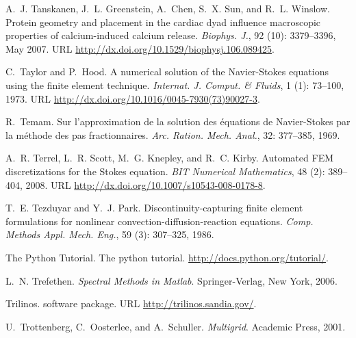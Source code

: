 \begin{thebibliography}{467}
A.~J. Tanskanen, J.~L. Greenstein, A.~Chen, S.~X. Sun, and R.~L. Winslow.
\newblock Protein geometry and placement in the cardiac dyad influence
  macroscopic properties of calcium-induced calcium release.
\newblock \emph{Biophys. J.}, 92 (10): 3379--3396, May 2007.
\newblock URL \url{http://dx.doi.org/10.1529/biophysj.106.089425}.

C.~Taylor and P.~Hood.
\newblock A numerical solution of the {N}avier-{S}tokes equations using the
  finite element technique.
\newblock \emph{Internat. J. Comput. \& Fluids}, 1 (1):
  73--100, 1973.
\newblock URL \url{http://dx.doi.org/10.1016/0045-7930(73)90027-3}.

R.~Temam.
\newblock Sur l'approximation de la solution des {\'{e}}quations de
  {N}avier-{S}tokes par la m{\'{e}}thode des pas fractionnaires.
\newblock \emph{Arc. Ration. Mech. Anal.}, 32: 377--385, 1969.

A.~R. Terrel, L.~R. Scott, M.~G. Knepley, and R.~C. Kirby.
\newblock Automated {FEM} discretizations for the {S}tokes equation.
\newblock \emph{BIT Numerical Mathematics}, 48 (2): 389--404,
  2008.
\newblock URL \url{http://dx.doi.org/10.1007/s10543-008-0178-8}.

T.~E. Tezduyar and Y.~J. Park.
\newblock Discontinuity-capturing finite element formulations for nonlinear
  convection-diffusion-reaction equations.
\newblock \emph{Comp. Methods Appl. Mech. Eng.}, 59 (3):
  307--325, 1986.

The Python Tutorial.
\newblock The python tutorial.
\newblock \url{http://docs.python.org/tutorial/}.

L.~N. Trefethen.
\newblock \emph{Spectral Methods in Matlab}.
\newblock Springer-Verlag, New York, 2006.

{Trilinos}.
\newblock software package.
\newblock URL \url{http://trilinos.sandia.gov/}.

U.~Trottenberg, C.~Oosterlee, and A.~Schuller.
\newblock \emph{Multigrid}.
\newblock Academic Press, 2001.


\end{thebibliography}
